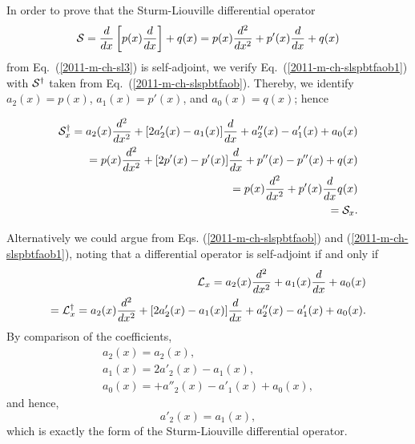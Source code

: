 {\color{OliveGreen}
\bproof

In order to prove that the  Sturm-Liouville differential operator
\begin{equation}
\begin{split}
{\cal S}
=       \frac{d}{dx}
\left[
p(x)
\frac{d}{dx}
\right]
+
q(x)
= p(x) \frac{d^2}{dx^2}
+p'(x) \frac{d}{dx}
+q(x)
\end{split}
\label{2011-m-ch-slspbtfaoc}
\end{equation}
from Eq.~(\ref{2011-m-ch-sl3})
is self-adjoint, we verify
Eq.~(\ref{2011-m-ch-slspbtfaob1})
with
${\cal S}^\dagger$
taken from
Eq.~(\ref{2011-m-ch-slspbtfaob}).
Thereby, we identify
$a_2(x) = p(x)$,
$a_1(x) = p'(x)$,
and
$a_0(x) = q(x)$; hence

\begin{equation}
\begin{split}
{\cal S}_x^\dagger
=a_2(x) \frac{d^2}{dx^2}
+
[2 a'_2(x)- a_1(x) ]  \frac{d}{dx}
+ a''_2(x)   - a'_1(x)   + a_0(x) \\
\qquad =
p(x)  \frac{d^2}{dx^2}
+ [2 p'(x)-p'(x)] \frac{d}{dx}
+p''(x)-p''(x)+q(x) \\
\qquad =
p(x)  \frac{d^2}{dx^2}
+ p'(x) \frac{d}{dx}
q(x)\\
\qquad = {\cal S}_x
.
\end{split}
\end{equation}

Alternatively we could argue from Eqs. (\ref{2011-m-ch-slspbtfaob}) and (\ref{2011-m-ch-slspbtfaob1}),
noting that
a differential operator is self-adjoint if and only if
\begin{equation}
\begin{split}
 {\cal L}_x
=a_2(x) \frac{d^2}{dx^2}   +  a_1(x)\frac{d }{dx }    + a_0(x) \\
=   {\cal L}_x^\dagger =
 a_2(x) \frac{d^2}{dx^2}
+
[2 a'_2(x)- a_1(x) ]  \frac{d}{dx}
+ a''_2(x)   - a'_1(x)   + a_0(x)
.
\end{split}
\end{equation}
By comparison of the coefficients,
\begin{equation}
\begin{split}
a_2(x)=a_2(x),\\
a_1(x) =
2 a'_2(x)- a_1(x)   ,\\
a_0(x) =
+ a''_2(x)   - a'_1(x)   + a_0(x)
,
\end{split}
\end{equation}
and hence,
\begin{equation}
 a'_2(x)= a_1(x),
\end{equation}
which is exactly the form of the   Sturm-Liouville differential operator.

\eproof
}


